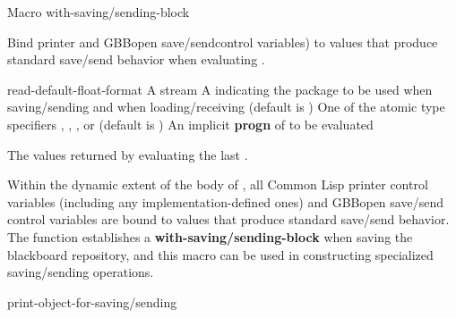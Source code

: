 \documentclass[10pt,twoside,english,pdftex]{article}
\begin{document}
\begin{functiondoc}{Macro}%
  {with-saving/sending-block}%
  {\code{(} 
     \code{)}
    \superstar
    \returns{} \superstar}
  
\fnsyntax

\fnpurpose Bind printer and GBBopen save/sendcontrol variables) to
values that produce standard save/send behavior when evaluating
.

\fnpackage {}

\fnmodule {}

\fnargs
\begin{args}{read-default-float-format}
\arg[stream] A stream
\arg[package] A  indicating the package to
be used when saving/sending and when loading/receiving (default is
)
 One of the atomic type specifiers
, , , or
 (default is )
\arg[forms] An implicit \textbf{progn} of  to be evaluated
\end{args}

\fnreturns The values returned by evaluating the last .

\fndescription 
Within the dynamic extent of the body of , all Common Lisp
printer control variables (including any implementation-defined ones)
and GBBopen save/send control variables are bound to values that
produce standard save/send behavior.  The function
\textbf{} establishes a
\textbf{with-saving/sending-block} when saving the blackboard
repository, and this macro can be used in constructing specialized
saving/sending operations.

\begin{alsos}{print-object-for-saving/sending}
\end{alsos}

\end{functiondoc}


\W\renewcommand{\subsubentities}{}

\T\markright{}%
\T\pagestyle{plain}
\T\cleardoublepage
\W{}
\T\pagestyle{fancy}
\T\thispagestyle{fancybottom}
\T\global\def\fnlastname{ }%
\T\renewcommand{\headrulewidth}{0pt}
\end{document}
